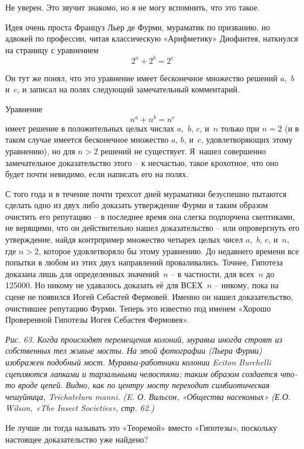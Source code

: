 \documentclass[../main.tex]{subfiles}
\begin{document}
\begin{dialogue}
 Не уверен. Это звучит знакомо, но я не могу вспомнить, что это такое.

 Идея очень проста Француз Льер де Фурми, мураматик по призванию, но адвокей по профессии, читая классическую «Арифметику» Диофантея, наткнулся на страницу с уравнением
\[
    2^{a} + 2^{b} = 2^{c}
\]

Он тут же понял, что это уравнение имеет бесконечное множество решений $a$,~$b$ и~$c$, и записал на полях следующий замечательный комментарий.

Уравнение
\[
    n^{a} + n^{b} = n^{c}
\]
имеет решение в положительных целых числах $a$,~$b$, $c$, и~$n$ только при $n = 2$ (и в таком случае имеется бесконечное множество $a$, $b$, и~$c$, удовлетворяющих этому уравнению), но для $n > 2$ решений не существует. Я~нашел совершенно замечательное доказательство этого \--- к несчастью, такое крохотное, что оно будет почти невидимо, если написать его на полях.

С того года и в течение почти трехсот дней мураматики безуспешно пытаются сделать одно из двух либо доказать утверждение Фурми и таким образом очистить его репутацию \--- в последнее время она слегка подпорчена скептиками, не верящими, что он действительно нашел доказательство \--- или опровергнуть его утверждение, найдя контрпример множество четырех целых чисел $a$,~$b$, $c$, и~$n$, где $n > 2$, которое удовлетворяло бы этому уравнению. До недавнего времени все попытки в любом из этих двух направлений проваливались. Точнее, Гипотеза доказана лишь для определенных значений~$n$ \--- в частности, для всех~$n$ до \num{125 000}. Но никому не удавалось доказать её для ВСЕХ~$n$ \--- никому, пока на сцене не появился Иогей Себастей Фермовей. Именно он нашел доказательство, очистившее репутацию Фурми. Теперь это известно под именем «Хорошо Проверенной Гипотезы Иогея Себастея Фермовея».

\emph{Рис. 63. Когда происходят перемещения колоний, муравьи иногда строят из собственных тел живые мосты. На этой фотографии (Льера Фурми) изображен подобный мост. Муравьи-работники колонии Eciton Burchelli сцепляются лапками и тарзальными челюстями; таким образом создается что-то вроде цепей. Видно, как по центру мосту переходит симбиотическая чешуйница, Trichatelura manni. (E. О. Вильсон, «Общества насекомых» (Е.О. Wilson, «The Insect Societies», стр. 62.)}

 Не лучше ли тогда называть это «Теоремой» вместо «Гипотезы», поскольку настоящее доказательство уже найдено?


\end{dialogue}
\end{document}
